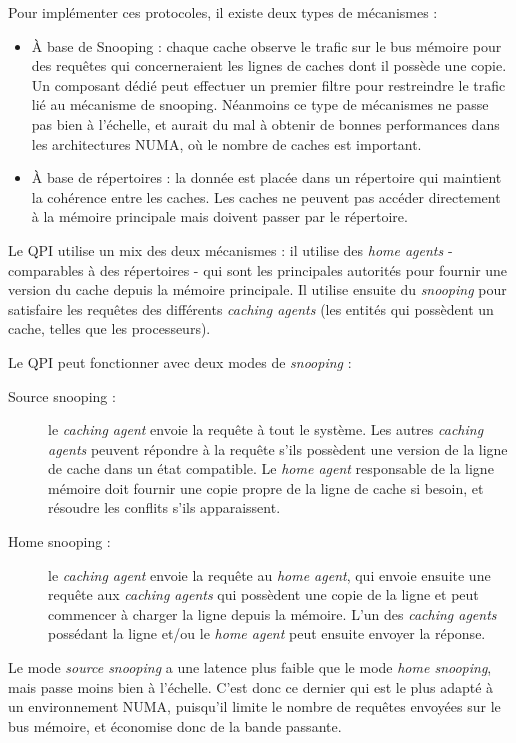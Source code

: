 Pour implémenter ces protocoles, il existe deux types de mécanismes :

\begin{itemize}
  \item À base de Snooping : chaque cache observe le trafic sur le bus mémoire pour des requêtes qui concerneraient les lignes de caches dont il possède une copie. Un composant dédié peut effectuer un premier filtre pour restreindre le trafic lié au mécanisme de snooping. Néanmoins ce type de mécanismes ne passe pas bien à l'échelle, et aurait du mal à obtenir de bonnes performances dans les architectures NUMA, où le nombre de caches est important.

  \item À base de répertoires : la donnée est placée dans un répertoire qui maintient la cohérence entre les caches. Les caches ne peuvent pas accéder directement à la mémoire principale mais doivent passer par le répertoire.
\end{itemize}

Le QPI utilise un mix des deux mécanismes : il utilise des \emph{home agents} - comparables à des répertoires - qui sont les principales autorités pour fournir une version du cache depuis la mémoire principale.
Il utilise ensuite du \emph{snooping} pour satisfaire les requêtes des différents \emph{caching agents} (les entités qui possèdent un cache, telles que les processeurs).

Le QPI peut fonctionner avec deux modes de \emph{snooping} :
\begin{description}
  \item [Source snooping :] le \emph{caching agent} envoie la requête à tout le système. Les autres \emph{caching agents} peuvent répondre à la requête s'ils possèdent une version de la ligne de cache dans un état compatible. Le \emph{home agent} responsable de la ligne mémoire doit fournir une copie propre de la ligne de cache si besoin, et résoudre les conflits s'ils apparaissent.
  \item [Home snooping :] le \emph{caching agent} envoie la requête au \emph{home agent}, qui envoie ensuite une requête aux \emph{caching agents} qui possèdent une copie de la ligne et peut commencer à charger la ligne depuis la mémoire. L'un des \emph{caching agents} possédant la ligne et/ou le \emph{home agent} peut ensuite envoyer la réponse.
\end{description}

Le mode \emph{source snooping} a une latence plus faible que le mode \emph{home snooping}, mais passe moins bien à l'échelle.
C'est donc ce dernier qui est le plus adapté à un environnement NUMA, puisqu'il limite le nombre de requêtes envoyées sur le bus mémoire, et économise donc de la bande passante.

